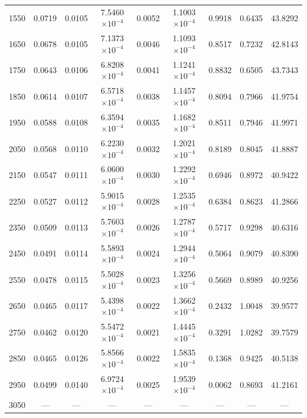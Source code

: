 \begin{table}[htbp]
\begin{tabular}{|c|c|c|c|c|c|c|c|c|}
    \hline
    1550 & 0.0719 & 0.0105 & 7.5460$\times 10^{-4}$ & 0.0052 & 1.1003$\times 10^{-4}$ & 0.9918 & 0.6435 & 43.8292 \\
    1650 & 0.0678 & 0.0105 & 7.1373$\times 10^{-4}$ & 0.0046 & 1.1093$\times 10^{-4}$ & 0.8517 & 0.7232 & 42.8143 \\
    1750 & 0.0643 & 0.0106 & 6.8208$\times 10^{-4}$ & 0.0041 & 1.1241$\times 10^{-4}$ & 0.8832 & 0.6505 & 43.7343 \\
    1850 & 0.0614 & 0.0107 & 6.5718$\times 10^{-4}$ & 0.0038 & 1.1457$\times 10^{-4}$ & 0.8094 & 0.7966 & 41.9754 \\
    1950 & 0.0588 & 0.0108 & 6.3594$\times 10^{-4}$ & 0.0035 & 1.1682$\times 10^{-4}$ & 0.8511 & 0.7946 & 41.9971 \\
    \hline
    2050 & 0.0568 & 0.0110 & 6.2230$\times 10^{-4}$ & 0.0032 & 1.2021$\times 10^{-4}$ & 0.8189 & 0.8045 & 41.8887 \\
    2150 & 0.0547 & 0.0111 & 6.0600$\times 10^{-4}$ & 0.0030 & 1.2292$\times 10^{-4}$ & 0.6946 & 0.8972 & 40.9422 \\
    2250 & 0.0527 & 0.0112 & 5.9015$\times 10^{-4}$ & 0.0028 & 1.2535$\times 10^{-4}$ & 0.6384 & 0.8623 & 41.2866 \\
    2350 & 0.0509 & 0.0113 & 5.7603$\times 10^{-4}$ & 0.0026 & 1.2787$\times 10^{-4}$ & 0.5717 & 0.9298 & 40.6316 \\
    2450 & 0.0491 & 0.0114 & 5.5893$\times 10^{-4}$ & 0.0024 & 1.2944$\times 10^{-4}$ & 0.5064 & 0.9079 & 40.8390 \\
    \hline
    2550 & 0.0478 & 0.0115 & 5.5028$\times 10^{-4}$ & 0.0023 & 1.3256$\times 10^{-4}$ & 0.5669 & 0.8989 & 40.9256 \\
    2650 & 0.0465 & 0.0117 & 5.4398$\times 10^{-4}$ & 0.0022 & 1.3662$\times 10^{-4}$ & 0.2432 & 1.0048 & 39.9577 \\
    2750 & 0.0462 & 0.0120 & 5.5472$\times 10^{-4}$ & 0.0021 & 1.4445$\times 10^{-4}$ & 0.3291 & 1.0282 & 39.7579 \\
    2850 & 0.0465 & 0.0126 & 5.8566$\times 10^{-4}$ & 0.0022 & 1.5835$\times 10^{-4}$ & 0.1368 & 0.9425 & 40.5138 \\
    2950 & 0.0499 & 0.0140 & 6.9724$\times 10^{-4}$ & 0.0025 & 1.9539$\times 10^{-4}$ & 0.0062 & 0.8693 & 41.2161 \\
    \hline
    3050 & --- & --- & --- & --- & --- & --- & --- & --- \\
    \hline
  \end{tabular}
\end{table}
